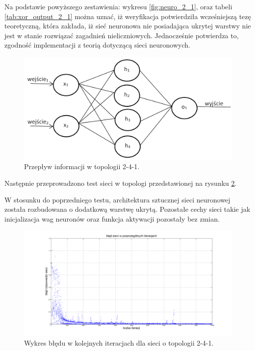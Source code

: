 Na podstawie powyższego zestawienia: wykresu \ref{fig:neuro_2_1}, oraz tabeli \ref{tab:xor_output_2_1} można uznać, iż weryfikacja potwierdziła wcześniejszą tezę teoretyczną, która zakłada, iż sieć neuronowa nie posiadająca ukrytej warstwy nie jest w stanie rozwiązać zagadnień nieliczniowych. Jednocześnie potwierdza to, zgodność implementacji z teorią dotyczącą sieci neuronowych.

\begin{figure}[!htbp]
\centering
\includegraphics[width=0.7\linewidth]{./include/flow_2_4_1}
\caption{Przepływ informacji w topologii 2-4-1.}
\label{fig:flow_2_4_1}
\end{figure}

Następnie przeprowadzono test sieci w topologi przedstawionej na rysunku \ref{fig:neuro_2_4_1}.

W stosunku do poprzedniego testu, architektura sztucznej sieci neuronowej została rozbudowana o dodatkową warstwę ukrytą. Pozostałe cechy sieci takie jak inicjalizacja wag neuronów oraz funkcja aktywacji pozostały bez zmian.

\begin{figure}[!htbp]
\centering
\includegraphics[width=1\linewidth]{./include/topologia_2_4_1}
\caption{Wykres błędu w kolejnych iteracjach dla sieci o topologii 2-4-1.}
\label{fig:neuro_2_4_1}
\end{figure}


